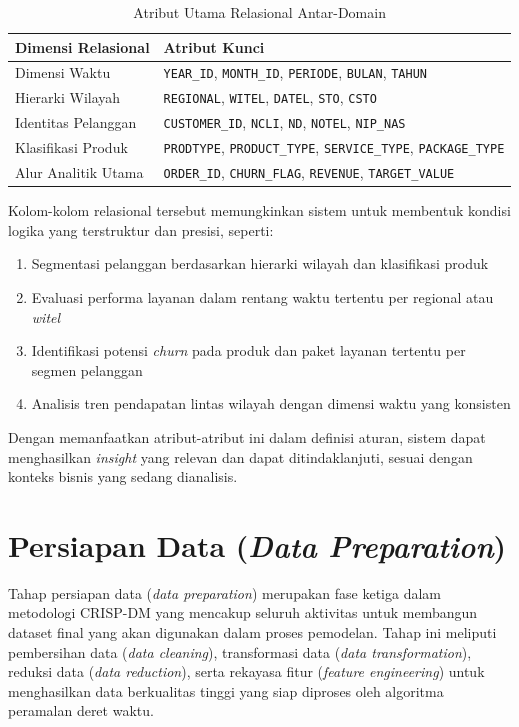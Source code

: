 \begin{table}[htbp]
\centering
\caption{Atribut Utama Relasional Antar-Domain}
\label{tab:atribut-relasional}
\begin{tabular}{|p{3.5cm}|p{8cm}|}
\hline
\textbf{Dimensi Relasional} & \textbf{Atribut Kunci} \\
\hline
Dimensi Waktu & \texttt{YEAR\_ID}, \texttt{MONTH\_ID}, \texttt{PERIODE}, \texttt{BULAN}, \texttt{TAHUN} \\
\hline
Hierarki Wilayah & \texttt{REGIONAL}, \texttt{WITEL}, \texttt{DATEL}, \texttt{STO}, \texttt{CSTO} \\
\hline
Identitas Pelanggan & \texttt{CUSTOMER\_ID}, \texttt{NCLI}, \texttt{ND}, \texttt{NOTEL}, \texttt{NIP\_NAS} \\
\hline
Klasifikasi Produk & \texttt{PRODTYPE}, \texttt{PRODUCT\_TYPE}, \texttt{SERVICE\_TYPE}, \texttt{PACKAGE\_TYPE} \\
\hline
Alur Analitik Utama & \texttt{ORDER\_ID}, \texttt{CHURN\_FLAG}, \texttt{REVENUE}, \texttt{TARGET\_VALUE} \\
\hline
\end{tabular}
\end{table}

Kolom-kolom relasional tersebut memungkinkan sistem untuk membentuk kondisi logika yang terstruktur dan presisi, seperti:
\begin{enumerate}
    \item Segmentasi pelanggan berdasarkan hierarki wilayah dan klasifikasi produk
    \item Evaluasi performa layanan dalam rentang waktu tertentu per regional atau \textit{witel}
    \item Identifikasi potensi \textit{churn} pada produk dan paket layanan tertentu per segmen pelanggan
    \item Analisis tren pendapatan lintas wilayah dengan dimensi waktu yang konsisten
\end{enumerate}

Dengan memanfaatkan atribut-atribut ini dalam definisi aturan, sistem dapat menghasilkan \textit{insight} yang relevan dan dapat ditindaklanjuti, sesuai dengan konteks bisnis yang sedang dianalisis.

\section{Persiapan Data (\textit{Data Preparation})}

Tahap persiapan data (\textit{data preparation}) merupakan fase ketiga dalam metodologi CRISP-DM yang mencakup seluruh aktivitas untuk membangun dataset final yang akan digunakan dalam proses pemodelan. Tahap ini meliputi pembersihan data (\textit{data cleaning}), transformasi data (\textit{data transformation}), reduksi data (\textit{data reduction}), serta rekayasa fitur (\textit{feature engineering}) untuk menghasilkan data berkualitas tinggi yang siap diproses oleh algoritma peramalan deret waktu.

